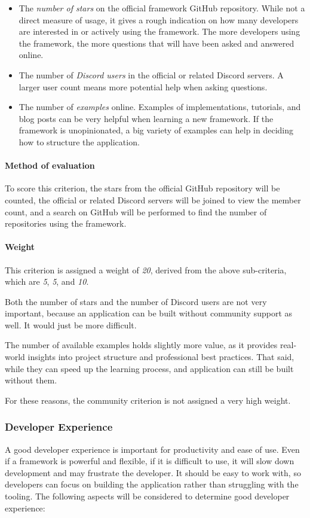\begin{itemize}
	\item The \emph{number of stars} on the official framework GitHub repository.
	      While not a direct measure of usage, it gives a rough indication on how many developers are interested in or actively using the framework.
	      The more developers using the framework, the more questions that will have been asked and answered online.
	\item The number of \emph{Discord users} in the official or related Discord servers.
	      A larger user count means more potential help when asking questions.
	\item The number of \emph{examples} online.
	      Examples of implementations, tutorials, and blog posts can be very helpful when learning a new framework.
	      If the framework is unopinionated, a big variety of examples can help in deciding how to structure the application.
\end{itemize}

\paragraph{Method of evaluation}
To score this criterion, the stars from the official GitHub repository will be counted, the official or related Discord servers will be joined to view the member count, and a search on GitHub will be performed to find the number of repositories using the framework.

\paragraph{Weight}
This criterion is assigned a weight of \emph{20}, derived from the above sub-criteria, which are \emph{5}, \emph{5}, and \emph{10}.

Both the number of stars and the number of Discord users are not very important, because an application can be built without community support as well.
It would just be more difficult.

The number of available examples holds slightly more value, as it provides real-world insights into project structure and professional best practices.
That said, while they can speed up the learning process, and application can still be built without them.

For these reasons, the community criterion is not assigned a very high weight.

\subsubsection{Developer Experience}\label{subsubsec:developer-experience}
A good developer experience is important for productivity and ease of use.
Even if a framework is powerful and flexible, if it is difficult to use, it will slow down development and may frustrate the developer.
It should be easy to work with, so developers can focus on building the application rather than struggling with the tooling.
The following aspects will be considered to determine good developer experience:

